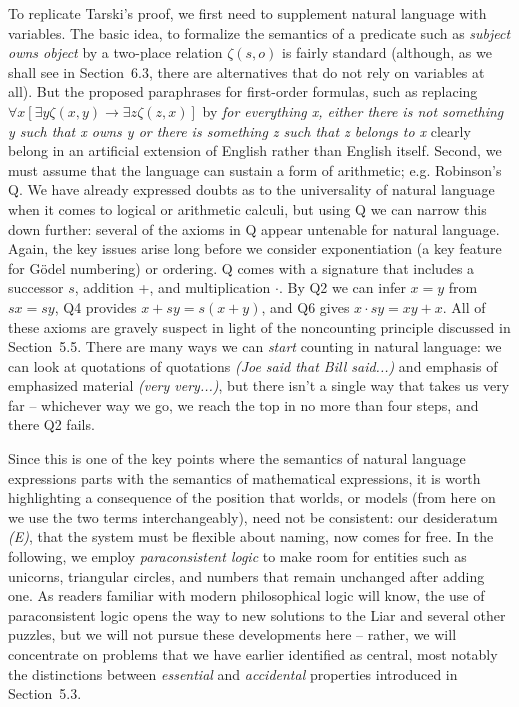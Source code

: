 To replicate Tarski's proof, we first need to supplement natural language with
variables. The basic idea, to formalize the semantics of a predicate such as
{\it subject owns object} by a two-place relation $\zeta(s,o)$ is fairly
standard (although, as we shall see in Section~6.3, there are alternatives
that do not rely on variables at all). But the proposed paraphrases for
first-order formulas, such as replacing $\forall x [\exists y \zeta(x,y)
  \rightarrow \exists z \zeta(z,x)]$ by {\it for everything x, either there is
  not something y such that x owns y or there is something z such that z
  belongs to x} clearly belong in an artificial extension of English rather
than English itself.  Second, we must assume that the language can sustain a
form of arithmetic; e.g.  Robinson's Q. We have already expressed doubts as to
the universality of natural language when it comes to logical or arithmetic
calculi, but using Q we can narrow this down further: several of the axioms in
Q appear untenable for natural language.  Again, the key issues arise long
before we consider exponentiation (a key feature for G\"{o}del numbering) or
ordering.  Q comes with a signature that includes a successor $s$, addition +,
and multiplication $\cdot$. By Q2 we can infer $x=y$ from $sx=sy$, Q4 provides
$x+sy=s(x+y)$, and Q6 gives $x \cdot sy = xy + x$. All of these axioms are
gravely suspect in light of the noncounting principle discussed in
Section~5.5.  There are many ways we can {\it start} counting in natural
language: we can look at quotations of quotations {\it (Joe said that Bill
  said...)} and emphasis of emphasized material {\it (very very...)}, but
there isn't a single way that takes us very far -- whichever way we go, we
reach the top in no more than four steps, and there Q2 fails.

Since this is one of the key points where the semantics of natural language
expressions parts with the semantics of mathematical expressions, it is worth
highlighting a consequence of the position that worlds, or models (from here
on we use the two terms interchangeably), need not be consistent: our
desideratum {\sl (E)}, that the system must be flexible about naming, now
comes for free. In the following, we employ {\it paraconsistent logic} to make
room for entities such as unicorns, triangular circles, and numbers that
remain unchanged after adding one.   As readers
familiar with modern philosophical logic will know, the use of paraconsistent
logic opens the way to new solutions to the Liar and several other puzzles,
but we will not pursue these developments here -- rather, we will concentrate
on problems that we have earlier identified as central, most notably the
distinctions between {\it essential} and {\it accidental} properties
introduced in Section~5.3.

